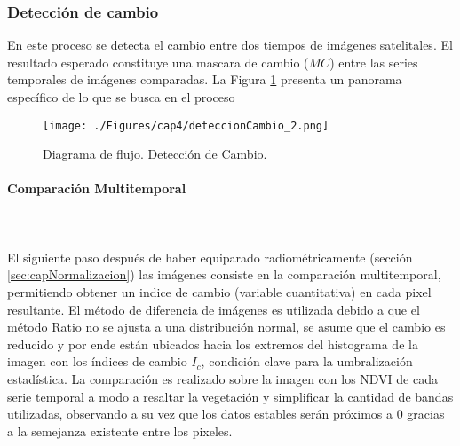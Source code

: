 \subsubsection{Detecci\'on de cambio}
En este proceso se detecta el cambio entre dos tiempos de im\'agenes satelitales. El resultado esperado constituye una mascara de cambio ($ MC $) entre las series temporales de im\'agenes comparadas. La Figura \ref{fig:deteccionCambio} presenta un panorama espec\'ifico de lo que se busca en el proceso
\begin{figure}[H]
	\centering
	\texttt{[image: ./Figures/cap4/deteccionCambio\_2.png]}
	\caption{Diagrama de flujo. Detecci\'on de Cambio.}
	\label{fig:deteccionCambio}
\end{figure}
\paragraph{Comparaci\'on Multitemporal}\mbox{}\\\mbox{}\\
El siguiente paso despu\'es de haber equiparado radiom\'etricamente (secci\'on \ref{sec:capNormalizacion}) las im\'agenes consiste en la comparaci\'on multitemporal, permitiendo obtener un indice de cambio (variable cuantitativa) en cada pixel resultante. El m\'etodo de diferencia de im\'agenes es utilizada debido a que el m\'etodo Ratio no se ajusta a una distribuci\'on normal, se asume que el cambio es reducido y por ende est\'an ubicados hacia los extremos del histograma de la imagen con los \'indices de cambio $ I_{c} $, condici\'on clave para la umbralizaci\'on estad\'istica. La comparaci\'on es realizado sobre la imagen con los NDVI de cada serie temporal a modo a resaltar la vegetaci\'on y simplificar la cantidad de bandas utilizadas, observando a su vez que los datos estables ser\'an pr\'oximos a $ 0 $ gracias a la semejanza existente entre los pixeles. 
